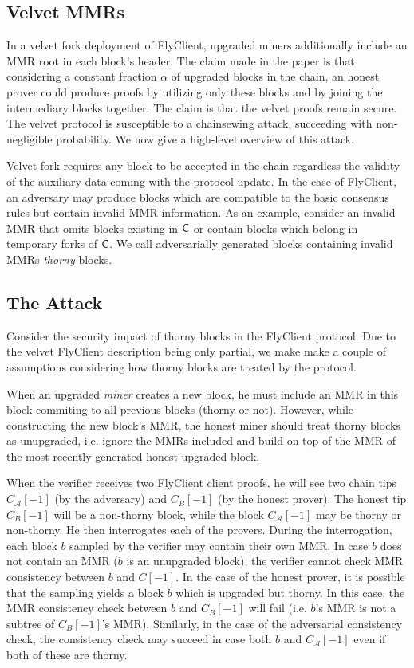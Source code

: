 \subsection{Velvet MMRs}
	In a velvet fork deployment of FlyClient, upgraded miners additionally include an MMR root in each block's header.
    The claim made in the paper is that considering a constant fraction $\alpha$ of upgraded blocks in the chain, an honest prover could produce proofs
    by utilizing only these blocks and by joining the intermediary blocks together.
    The claim is that the velvet proofs remain secure. The velvet protocol is susceptible to a chainsewing attack, succeeding with non-negligible probability.
    We now give a high-level overview of this attack.

	Velvet fork requires any block to be accepted in the chain regardless the validity of the auxiliary data coming with the protocol update.
    In the case of FlyClient, an adversary may produce blocks which are compatible to the basic consensus rules but contain invalid MMR information.
    As an example, consider an invalid MMR that omits blocks existing in $\mathsf{C}$ or contain blocks which belong in temporary forks of $\mathsf{C}$.
    We call adversarially generated blocks containing invalid MMRs \emph{thorny} blocks.

\subsection{The Attack}
	Consider the security impact of thorny blocks in the FlyClient protocol.
	Due to the velvet FlyClient description being only partial, we make
	make a couple of assumptions considering how thorny blocks are treated by the protocol.

	When an upgraded \emph{miner} creates a new block, he must include an MMR in this block
	commiting to all previous blocks (thorny or not).
	However, while constructing the new block's MMR, the honest miner should treat thorny blocks as unupgraded, i.e. ignore the MMRs included and build on top of the MMR of the most recently generated honest upgraded block.  
	
	When the verifier receives two FlyClient client proofs, he will see two chain tips $C_\mathcal{A}[-1]$ (by the adversary) and $C_B[-1]$
	(by the honest prover). The honest tip $C_B[-1]$ will be a non-thorny block, while the block $C_\mathcal{A}[-1]$ may be thorny or
	non-thorny. He then interrogates each of the provers. During the interrogation, each block $b$ sampled by the verifier may
	contain their own MMR. In case $b$ does not contain an MMR ($b$ is an unupgraded block), the verifier cannot check MMR consistency
	between $b$ and $C[-1]$.
	In the case of the honest prover, it is possible that the sampling yields a block $b$ which is upgraded but thorny.
	In this case, the MMR consistency check between $b$ and $C_B[-1]$ will fail (i.e. $b$'s MMR is not a subtree of $C_B[-1]$'s MMR).
	Similarly, in the case of the adversarial consistency check, the consistency check may succeed in case both $b$ and $C_\mathcal{A}[-1]$
	even if both of these are thorny.

